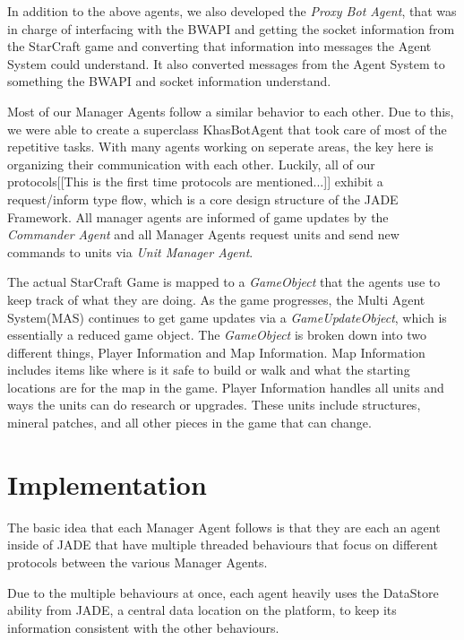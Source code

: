 \documentclass[letterpaper]{article}
\begin{document}
In addition to the above agents, we also developed the \emph{Proxy Bot Agent}, that was in charge of interfacing with the BWAPI and getting the socket information from the StarCraft game and converting that information into messages the Agent System could understand.  It also converted messages from the Agent System to something the BWAPI and socket information understand.

Most of our Manager Agents follow a similar behavior to each other. Due to this, we were able to create a superclass KhasBotAgent that took care of most of the repetitive tasks.  With many agents working on seperate areas, the key here is organizing their communication with each other.  Luckily, all of our protocols[[This is the first time protocols are mentioned...]] exhibit a request/inform type flow, which is a core design structure of the JADE Framework.  All manager agents are informed of game updates by the \emph{Commander Agent} and all Manager Agents request units and send new commands to units via \emph{Unit Manager Agent}.

The actual StarCraft Game is mapped to a \emph{GameObject} that the agents use to keep track of what they are doing.  As the game progresses, the Multi Agent System(MAS) continues to get game updates via a \emph{GameUpdateObject}, which is essentially a reduced game object.  The \emph{GameObject} is broken down into two different things, Player Information and Map Information. Map Information includes items like where is it safe to build or walk and what the starting locations are for the map in the game.  Player Information handles all units and ways the units can do research or upgrades.  These units include structures, mineral patches, and all other pieces in the game that can change.

\section{Implementation}
The basic idea that each Manager Agent follows is that they are each an agent inside of JADE that have multiple threaded behaviours that focus on different protocols between the various Manager Agents.

Due to the multiple behaviours at once, each agent heavily uses the DataStore ability from JADE, a central data location on the platform, to keep its information consistent with the other behaviours.
\end{document}
